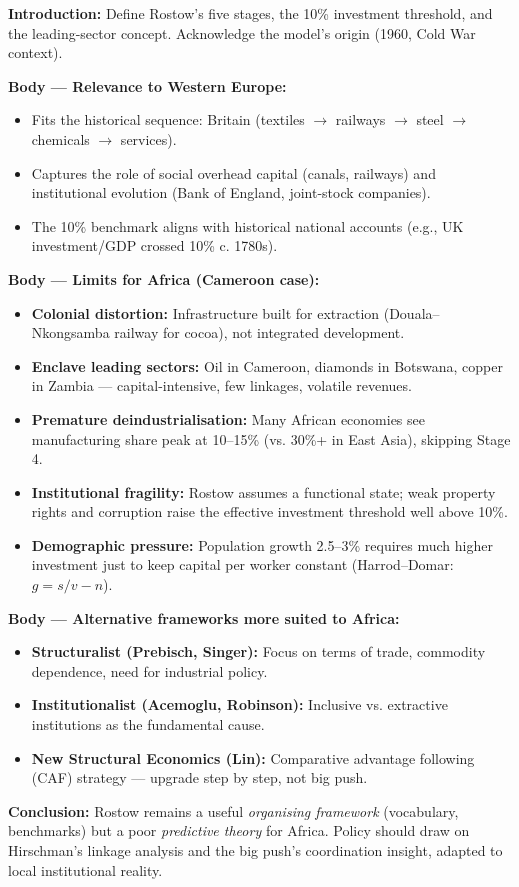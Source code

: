 \documentclass[11pt]{article}
\begin{document}
\begin{corrige}
\textbf{Introduction:} Define Rostow's five stages, the 10\% investment threshold, and the leading-sector concept. Acknowledge the model's origin (1960, Cold War context).

\textbf{Body — Relevance to Western Europe:}
\begin{itemize}
  \item Fits the historical sequence: Britain (textiles $\to$ railways $\to$ steel $\to$ chemicals $\to$ services).
  \item Captures the role of social overhead capital (canals, railways) and institutional evolution (Bank of England, joint-stock companies).
  \item The 10\% benchmark aligns with historical national accounts (e.g., UK investment/GDP crossed 10\% c. 1780s).
\end{itemize}

\textbf{Body — Limits for Africa (Cameroon case):}
\begin{itemize}
  \item \textbf{Colonial distortion:} Infrastructure built for extraction (Douala–Nkongsamba railway for cocoa), not integrated development.
  \item \textbf{Enclave leading sectors:} Oil in Cameroon, diamonds in Botswana, copper in Zambia — capital-intensive, few linkages, volatile revenues.
  \item \textbf{Premature deindustrialisation:} Many African economies see manufacturing share peak at 10–15\% (vs. 30\%+ in East Asia), skipping Stage 4.
  \item \textbf{Institutional fragility:} Rostow assumes a functional state; weak property rights and corruption raise the effective investment threshold well above 10\%.
  \item \textbf{Demographic pressure:} Population growth 2.5–3\% requires much higher investment just to keep capital per worker constant (Harrod–Domar: $g = s/v - n$).
\end{itemize}

\textbf{Body — Alternative frameworks more suited to Africa:}
\begin{itemize}
  \item \textbf{Structuralist (Prebisch, Singer):} Focus on terms of trade, commodity dependence, need for industrial policy.
  \item \textbf{Institutionalist (Acemoglu, Robinson):} Inclusive vs. extractive institutions as the fundamental cause.
  \item \textbf{New Structural Economics (Lin):} Comparative advantage following (CAF) strategy — upgrade step by step, not big push.
\end{itemize}

\textbf{Conclusion:} Rostow remains a useful \emph{organising framework} (vocabulary, benchmarks) but a poor \emph{predictive theory} for Africa. Policy should draw on Hirschman's linkage analysis and the big push's coordination insight, adapted to local institutional reality.
\end{corrige}
\end{document}
